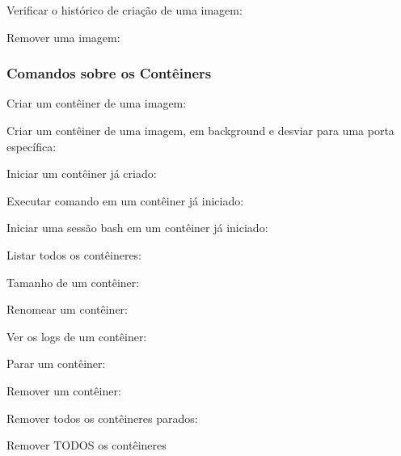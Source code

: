 \documentclass[a4paper,11pt]{article}
\begin{document}
Verificar o histórico de criação de uma imagem: \\

Remover uma imagem: \\

\subsubsection{Comandos sobre os Contêiners}
Criar um contêiner de uma imagem: \\

Criar um contêiner de uma imagem, em background e desviar para uma porta específica: \\

Iniciar um contêiner já criado: \\

Executar comando em um contêiner já iniciado: \\

Iniciar uma sessão bash em um contêiner já iniciado: \\

Listar todos os contêineres: \\

Tamanho de um contêiner: \\

Renomear um contêiner: \\

Ver os logs de um contêiner: \\

Parar um contêiner: \\

Remover um contêiner: \\

Remover todos os contêineres parados: \\

Remover TODOS os contêineres \\
\end{document}
